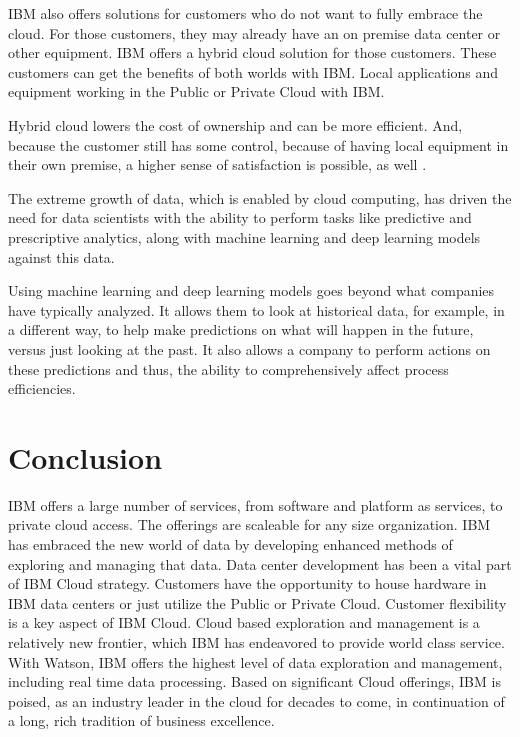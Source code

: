 \documentclass{acm_proc_article-sp}
\begin{document}
IBM also offers solutions for customers who do not want to fully embrace the cloud.  For those customers, they may already have an on premise data center or other equipment.  IBM offers a hybrid cloud solution for those customers.  These customers can get the benefits of both worlds with IBM.  Local applications and equipment working in the Public or Private Cloud with IBM.  

Hybrid cloud lowers the cost of ownership and can be more efficient.  And, because the customer still has some control, because of having local equipment in their own premise, a higher sense of satisfaction is possible, as well \cite{hid-sp18-525-hybrid}.  

The extreme growth of data, which is enabled by cloud computing, has driven the need for data scientists with the ability to perform tasks like predictive and prescriptive analytics, along with machine learning and deep learning models against this data.  

Using machine learning and deep learning models goes beyond what companies have typically analyzed.  It allows them to look at historical data, for example, in a different way, to help make predictions on what will happen in the future, versus just looking at the past.  It also allows a company to perform actions on these predictions and thus, the ability to comprehensively affect process efficiencies.  
 
 \section{Conclusion}
 IBM offers a large number of services, from software and platform as services, to private cloud access.  The offerings are scaleable for any size organization.  IBM has embraced the new world of data by developing enhanced methods of exploring and managing that data.  Data center development has been a vital part of IBM Cloud strategy.  Customers have the opportunity to house hardware in IBM data centers or just utilize the Public or Private Cloud.  Customer flexibility is a key aspect of IBM Cloud.  Cloud based exploration and management is a relatively new frontier, which IBM has endeavored to provide world class service.  With Watson, IBM offers the highest level of data exploration and management, including real time data processing.  Based on significant Cloud offerings, IBM is poised, as an industry leader in the cloud for decades to come, in continuation of a long, rich tradition of business excellence.
 
 



\end{document}

